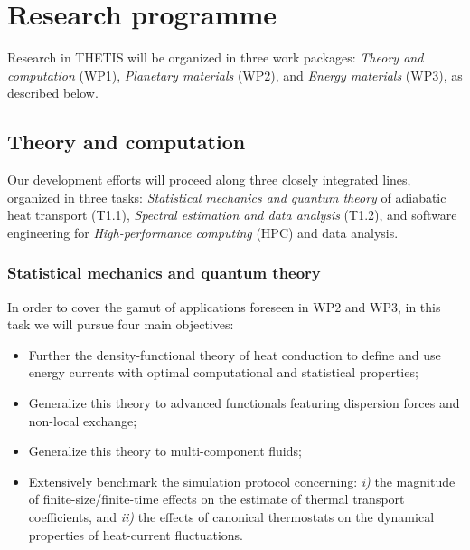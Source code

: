 \section{Research programme}

Research in THETIS will be organized in three work packages: \emph{Theory and computation} (WP1), \emph{Planetary materials} (WP2), and \emph{Energy materials} (WP3), as described below. 

\salta
\subsection{Theory and computation}
Our development efforts will proceed along three closely integrated lines, organized in three tasks: \emph{Statistical mechanics and quantum theory} of adiabatic heat transport (T1.1), \emph{Spectral estimation and data analysis} (T1.2), and software engineering for \emph{High-performance computing} (HPC) and data analysis.

\subsubsection{Statistical mechanics and quantum theory}
In order to cover the gamut of applications foreseen in WP2 and WP3, in this task we will pursue four main objectives: 
\begin{itemize} 
	\item Further the density-functional theory of heat conduction to define and use energy currents with optimal computational and statistical properties;
	\item Generalize this theory to advanced functionals featuring dispersion forces and non-local exchange;
	\item Generalize this theory to multi-component fluids;
	\item Extensively benchmark the simulation protocol concerning: \emph{i)} the magnitude of finite-size/finite-time effects on the estimate of thermal transport coefficients, and \emph{ii)} the effects of canonical thermostats on the dynamical properties of heat-current fluctuations.
\end{itemize}

